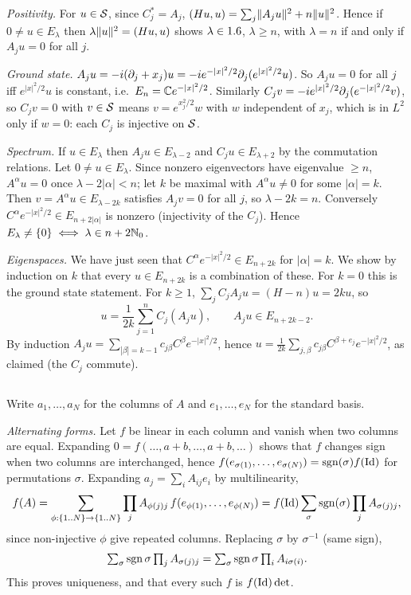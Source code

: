 \emph{Positivity.} For $u\in\mathcal{S}$, since $C_j^*=A_j$,
$(Hu,u)=\sum_j\lVert A_ju\rVert^2+n\lVert u\rVert^2$. Hence if $0\ne u\in E_\lambda$ then $\lambda\lVert u\rVert^2=(Hu,u)$ shows
$\lambda\in1.6$, $\lambda\ge n$, with $\lambda=n$ if and only if $A_ju=0$ for all $j$.

\emph{Ground state.} $A_ju=-i(\partial_j+x_j)u=-ie^{-|x|^2/2}\partial_j(e^{|x|^2/2}u)$. So $A_ju=0$ for all $j$
iff $e^{|x|^2/2}u$ is constant, i.e.\ $E_n=\mathbb{C} e^{-|x|^2/2}$. Similarly
$C_jv=-ie^{|x|^2/2}\partial_j(e^{-|x|^2/2}v)$, so $C_jv=0$ with $v\in\mathcal{S}$ means $v=e^{x_j^2/2}w$ with $w$
independent of $x_j$, which is in $L^2$ only if $w=0$: each $C_j$ is injective on $\mathcal{S}$.

\emph{Spectrum.} If $u\in E_\lambda$ then $A_ju\in E_{\lambda-2}$ and $C_ju\in E_{\lambda+2}$ by the
commutation relations. Let $0\neq u\in E_\lambda$. Since nonzero eigenvectors have eigenvalue $\ge n$,
$A^\alpha u=0$ once $\lambda-2|\alpha|<n$; let $k$ be maximal with $A^\alpha u\neq0$ for some $|\alpha|=k$.
Then $v=A^\alpha u\in E_{\lambda-2k}$ satisfies $A_jv=0$ for all $j$, so $\lambda-2k=n$. Conversely
$C^\alpha e^{-|x|^2/2}\in E_{n+2|\alpha|}$ is nonzero (injectivity of the $C_j$). Hence
$E_\lambda\neq\{0\}\iff\lambda\in n+2\mathbb{N}_0$.

\emph{Eigenspaces.} We have just seen that $C^\alpha e^{-|x|^2/2}\in E_{n+2k}$ for $|\alpha|=k$. We show by
induction on $k$ that every $u\in E_{n+2k}$ is a combination of these. For $k=0$ this is the ground
state statement. For $k\ge1$, $\sum_jC_jA_ju=(H-n)u=2ku$, so
\begin{equation*}
  u=\frac1{2k}\sum_{j=1}^nC_j(A_ju),\qquad A_ju\in E_{n+2k-2}.
\end{equation*}
By induction $A_ju=\sum_{|\beta|=k-1}c_{j\beta}C^\beta e^{-|x|^2/2}$, hence
$u=\frac1{2k}\sum_{j,\beta}c_{j\beta}C^{\beta+e_j}e^{-|x|^2/2}$, as claimed (the $C_j$ commute).

\subsection*{}
Write $a_1,\dots,a_N$ for the columns of $A$ and $e_1,\dots,e_N$ for the standard basis.

\emph{Alternating forms.} Let $f$ be linear in each column and vanish when two columns are equal.
Expanding $0=f(\dots,a+b,\dots,a+b,\dots)$ shows that $f$ changes sign when two columns are
interchanged, hence $f(e_{\sigma(1)},\dots,e_{\sigma(N)})=\operatorname{sgn}(\sigma)f(\operatorname{Id})$ for permutations $\sigma$.
Expanding $a_j=\sum_iA_{ij}e_i$ by multilinearity,
\begin{equation*}
  f(A)=\sum_{\phi:\{1..N\}\to\{1..N\}}\prod_jA_{\phi(j)j}\,f(e_{\phi(1)},\dots,e_{\phi(N)})
  =f(\operatorname{Id})\sum_\sigma\operatorname{sgn}(\sigma)\prod_jA_{\sigma(j)j},
\end{equation*}
since non-injective $\phi$ give repeated columns. Replacing $\sigma$ by $\sigma^{-1}$ (same sign),
\begin{equation*}
  \textstyle\sum_\sigma\operatorname{sgn}\sigma\prod_jA_{\sigma(j)j}=\sum_\sigma\operatorname{sgn}\sigma\prod_iA_{i\sigma(i)} .
\end{equation*}
This proves
uniqueness, and that every such $f$ is $f(\operatorname{Id})\det$.

